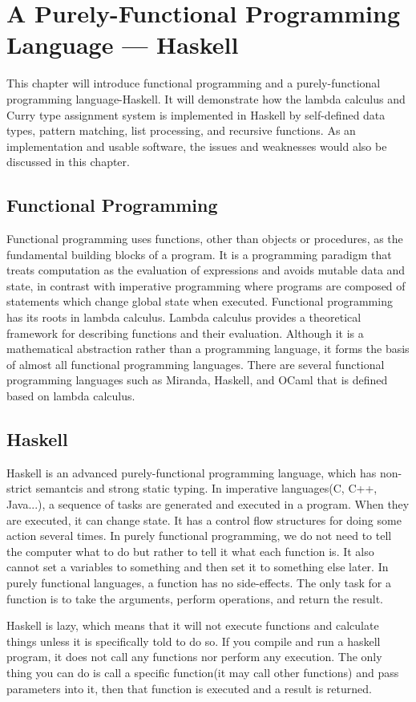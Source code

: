 \chapter{A Purely-Functional Programming Language --- Haskell}

This chapter will introduce functional programming and a purely-functional programming language-Haskell. It will demonstrate how the lambda calculus and Curry type assignment system is implemented in Haskell by self-defined data types, pattern matching, list processing, and recursive functions. As an implementation and usable software, the issues and weaknesses would also be discussed in this chapter. 
\section{Functional Programming}
Functional programming uses functions, other than objects or procedures, as the fundamental building blocks of a program. It is a programming paradigm that treats computation as the evaluation of expressions and avoids mutable data and state, in contrast with imperative programming where programs are composed of statements which change global state when executed. Functional programming has its roots in lambda calculus. Lambda calculus provides a theoretical framework for describing functions and their evaluation. Although it is a mathematical abstraction rather than a programming language, it forms the basis of almost all functional programming languages. There are several functional programming languages such as Miranda, Haskell, and OCaml that is defined based on lambda calculus. 
\section{Haskell}
Haskell is an advanced purely-functional programming language, which has non-strict semantcis and strong static typing. In imperative languages(C, C++, Java...), a sequence of tasks are generated and executed in a program. When they are executed, it can change state. It has a control flow structures for doing some action several times. In purely functional programming, we do not need to tell the computer what to do but rather to tell it what each function is. It also cannot set a variables to something and then set it to something else later. In purely functional languages, a function has no side-effects. The only task for a function is to take the arguments, perform operations, and return the result.  

Haskell is lazy, which means that it will not execute functions and calculate things unless it is specifically told to do so. If you compile and run a haskell program, it does not call any functions nor perform any execution. The only thing you can do is call a specific function(it may call other functions) and pass parameters into it, then that function is executed and a result is returned.   

